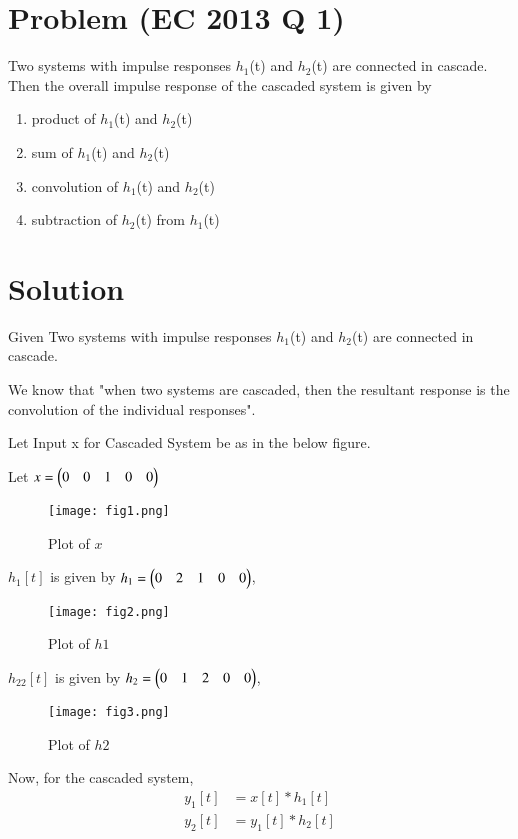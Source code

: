 \documentclass[journal,12pt,twocolumn]{IEEEtran}
\begin{document}
\section*{\textbf{Problem (EC 2013 Q 1)}}
Two systems with impulse responses $h_1$(t) and $h_2$(t) are connected in cascade. Then the overall 
impulse response of the cascaded system is given by
\begin{enumerate}
   \item product of $h_1$(t) and $h_2$(t)
   \item sum of $h_1$(t) and $h_2$(t) 
   \item convolution of $h_1$(t) and $h_2$(t) 
   \item subtraction of $h_2$(t) from $h_1$(t) 
\end{enumerate}
\section*{\textbf{Solution}}

Given Two systems with impulse responses $h_1$(t) and $h_2$(t) are connected in cascade.

We know that "when two systems are cascaded, then the resultant response is the convolution of the individual responses".

Let Input x for Cascaded System be as in the below figure.

Let $x = \begin{pmatrix}0&0&1&0&0\end{pmatrix}$

\begin{figure}[!ht]
    \centering
    \texttt{[image: fig1.png]}
    \caption{Plot of $x$}
    \label{x}
\end{figure}

$h_1[t]$ is given by $h_1 = \begin{pmatrix}0&2&1&0&0\end{pmatrix}$,

\begin{figure}[H]
    \centering
    \texttt{[image: fig2.png]}
    \caption{Plot of $h1$}
    \label{h1}
\end{figure}

$h_22[t]$ is given by $h_2 = \begin{pmatrix}0&1&2&0&0\end{pmatrix}$,

\begin{figure}[!h]
    \centering
    \texttt{[image: fig3.png]}
    \caption{Plot of $h2$}
    \label{h2}
\end{figure}

Now, for the cascaded system, 
\begin{align}
    y_1[t] &= x[t] * h_1[t] \\
    y_2[t] &= y_1[t] * h_2[t]
\end{align}
\end{document}
